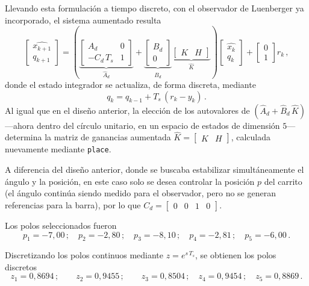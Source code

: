 Llevando esta formulación a tiempo discreto, con el observador de Luenberger ya incorporado, el sistema aumentado resulta
\[
\begin{bmatrix} \widehat{x_{k+1}} \\ q_{k+1} \end{bmatrix}
=
\left(
\underbrace{\begin{bmatrix} A_d & 0 \\ -C_d\,T_s & 1 \end{bmatrix}}_{\widehat{A}_d}
+
\underbrace{\begin{bmatrix} B_d \\ 0 \end{bmatrix}}_{\widehat{B}_d}
\underbrace{\begin{bmatrix} K & H \end{bmatrix}}_{\widehat{K}}
\right)
\begin{bmatrix} \widehat{x_k} \\ q_k \end{bmatrix}
+
\begin{bmatrix} 0 \\ 1 \end{bmatrix} r_k\,,
\]
donde el estado integrador se actualiza, de forma discreta, mediante
\[
q_k = q_{k-1} + T_s\,(r_k - y_k)\,.
\]
Al igual que en el diseño anterior, la elección de los autovalores de $\left( \widehat{A}_d + \widehat{B}_d\,\widehat{K} \right)$ —ahora dentro del círculo unitario, en un espacio de estados de dimensión $5$— determina la matriz de ganancias aumentada $\widehat{K} = \begin{bmatrix} K & H \end{bmatrix}$, calculada nuevamente mediante \texttt{place}.

A diferencia del diseño anterior, donde se buscaba estabilizar simultáneamente el ángulo y la posición, en este caso solo se desea controlar la posición $p$ del carrito (el ángulo continúa siendo medido para el observador, pero no se generan referencias para la barra), por lo que $C_d = \begin{bmatrix} 0 & 0 & 1 & 0 \end{bmatrix}$. 

Los polos seleccionados fueron
\[
p_1 = -7,00\,; \quad p_2 = -2,80 \,; \quad p_3 = -8,10 \,; \quad p_4 = -2,81 \,; \quad p_5 = -6,00 \,.    
\]

Discretizando los polos continuos mediante $z = e^{s\,T_s}$, se obtienen los polos discretos
\[
z_1 = 0,8694\,; \qquad z_2 = 0,9455\,; \qquad z_3 = 0,8504\,; \quad z_4 = 0,9454\,; \quad z_5 = 0,8869 \, .
\]

